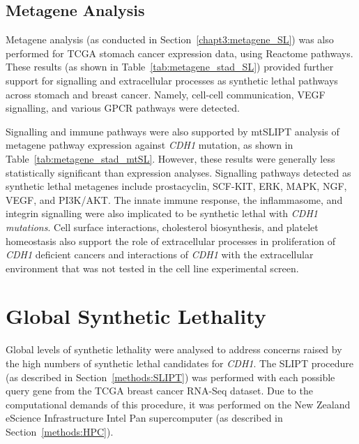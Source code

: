 \FloatBarrier

\subsection{Metagene Analysis} \label{chapt3:metagene_stad_SL}

Metagene analysis (as conducted in Section~\ref{chapt3:metagene_SL}) was also performed for TCGA stomach cancer expression data, using Reactome pathways. These results (as shown in Table~\ref{tab:metagene_stad_SL}) provided further support for signalling and extracellular processes as synthetic lethal pathways across stomach and breast cancer. Namely, cell-cell communication, VEGF signalling, and various GPCR pathways were detected.  

Signalling and immune pathways were also supported by mtSLIPT analysis of metagene pathway expression against \textit{CDH1} mutation, as shown in Table~\ref{tab:metagene_stad_mtSL}. However, these results were generally less statistically significant than expression analyses. Signalling pathways detected as synthetic lethal metagenes include prostacyclin, SCF-KIT, ERK, MAPK, NGF, VEGF, and PI3K/AKT. The innate immune response, the inflammasome, and integrin signalling were also implicated to be synthetic lethal with \textit{CDH1 mutations}. Cell surface interactions, cholesterol biosynthesis, and platelet homeostasis also support the role of extracellular processes in proliferation of \textit{CDH1} deficient cancers and interactions of \textit{CDH1} with the extracellular environment that was not tested in the cell line experimental screen.


\FloatBarrier

\section{Global Synthetic Lethality}

Global levels of synthetic lethality were analysed to address concerns raised by the high numbers of synthetic lethal candidates for \textit{CDH1}. The \gls{SLIPT} procedure (as described in Section~\ref{methods:SLIPT}) was performed with each possible query gene from the TCGA breast cancer RNA-Seq dataset. Due to the computational demands of this procedure, it was performed on the New Zealand eScience Infrastructure Intel Pan supercomputer (as described in Section~\ref{methods:HPC}).


